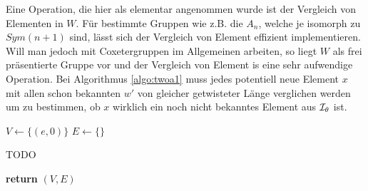 Eine Operation, die hier als elementar angenommen wurde ist der Vergleich von
Elementen in $W$. Für bestimmte Gruppen wie z.B. die $A_n$, welche je isomorph
zu $Sym(n+1)$ sind, lässt sich der Vergleich von Element effizient
implementieren. Will man jedoch mit Coxetergruppen im Allgemeinen arbeiten, so
liegt $W$ als frei präsentierte Gruppe vor und der Vergleich von Element is eine
sehr aufwendige Operation. Bei Algorithmus \ref{algo:twoa1} muss jedes
potentiell neue Element $x$ mit allen schon bekannten $w'$ von gleicher
getwisteter Länge verglichen werden um zu bestimmen, ob $x$ wirklich ein noch
nicht bekanntes Element aus $\mathcal{I}_{\theta}$ ist.

\begin{algo}[Algorithmus 2]
\hfill
\label{algo:twoa2}
\begin{algorithmic}[1]
 
\State $V \gets \{(e,0)\}$
\State $E \gets \{\}$

	\State TODO
\EndFor

\State \textbf{return} $(V,E)$
\EndProcedure
\end{algorithmic}
\end{algo}

